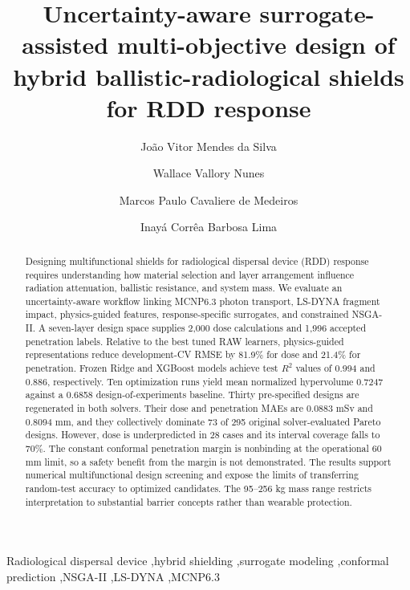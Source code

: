 \documentclass[12pt]{elsarticle}
\begin{document}
	
	\begin{frontmatter}
		
		\title{Uncertainty-aware surrogate-assisted multi-objective design of hybrid ballistic-radiological shields for RDD response}
		
		\author[pen]{Jo\~ao Vitor Mendes da Silva}
		\author[ime]{Wallace Vallory Nunes}
		\author[ime]{Marcos Paulo Cavaliere de Medeiros}
		\author[pen]{Inay\'a Corr\^ea Barbosa Lima}
			
		
		
		\begin{abstract}
Designing multifunctional shields for radiological dispersal device (RDD) response requires understanding how material selection and layer arrangement influence radiation attenuation, ballistic resistance, and system mass. We evaluate an uncertainty-aware workflow linking MCNP6.3 photon transport, LS-DYNA fragment impact, physics-guided features, response-specific surrogates, and constrained NSGA-II. A seven-layer design space supplies 2,000 dose calculations and 1,996 accepted penetration labels. Relative to the best tuned RAW learners, physics-guided representations reduce development-CV RMSE by 81.9\% for dose and 21.4\% for penetration. Frozen Ridge and XGBoost models achieve test $R^2$ values of 0.994 and 0.886, respectively. Ten optimization runs yield mean normalized hypervolume 0.7247 against a 0.6858 design-of-experiments baseline. Thirty pre-specified designs are regenerated in both solvers. Their dose and penetration MAEs are 0.0883 mSv and 0.8094 mm, and they collectively dominate 73 of 295 original solver-evaluated Pareto designs. However, dose is underpredicted in 28 cases and its interval coverage falls to 70\%. The constant conformal penetration margin is nonbinding at the operational 60 mm limit, so a safety benefit from the margin is not demonstrated. The results support numerical multifunctional design screening and expose the limits of transferring random-test accuracy to optimized candidates. The 95--256 kg mass range restricts interpretation to substantial barrier concepts rather than wearable protection.
\end{abstract}
		
		\begin{keyword}
			Radiological dispersal device \sep hybrid shielding \sep surrogate modeling \sep conformal prediction \sep NSGA-II \sep LS-DYNA \sep MCNP6.3
		\end{keyword}
		
	\end{frontmatter}
	
\end{document}
